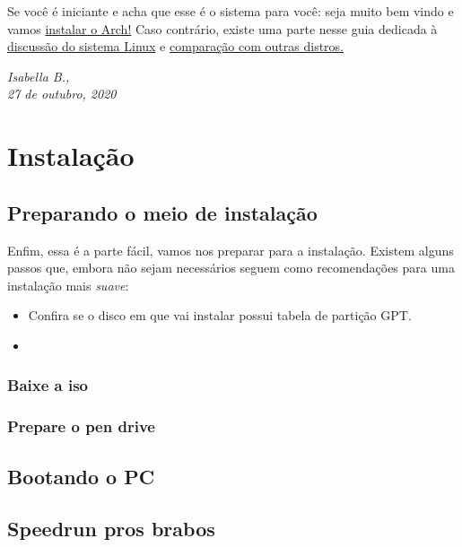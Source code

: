 \documentclass[dark, index]{Iart}
\begin{document}
  Se você é iniciante e acha que esse é o sistema para você: seja muito bem vindo e vamos \hyperref[part:install]{instalar o Arch!} Caso contrário, existe uma parte nesse guia dedicada à \hyperref[part:linuxSys]{discussão do sistema Linux} e \hyperref[chap:distros]{comparação com outras distros.}

  \vfill

  \begin{flushright}
    \itshape Isabella B.,\\
    27 de outubro, 2020
  \end{flushright}
	
	
	\part{Instalação}
  \label{part:install}
	
	\chapter{Preparando o meio de instalação}
    Enfim, essa é a parte fácil, vamos nos preparar para a instalação. Existem alguns passos que, embora não sejam necessários seguem como recomendações para uma instalação mais \textit{suave}:

  \begin{itemize}
    \item Confira se o disco em que vai instalar possui tabela de partição GPT.
    \item 
  \end{itemize}
	
	\section{Baixe a iso}
	
	\section{Prepare o pen drive}
		
	\chapter{Bootando o PC}
	
  \chapter{Speedrun pros brabos}
  
\end{document}
